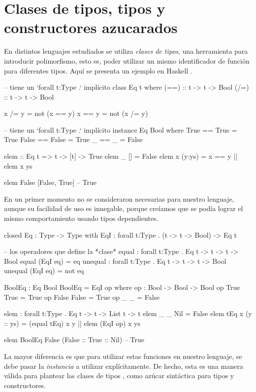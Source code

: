 {\section{Clases de tipos, tipos y constructores azucarados}

\begin{designfr}
En distintos lenguajes estudiados se utiliza \emph{clases de tipos}, una herramienta para introducir polimorfismo, esto es, poder utilizar un mismo identificador de función para diferentes tipos. Aquí se presenta un ejemplo en Haskell \cite{haskell}.

\begin{haskellcode}
-- tiene un `forall t:Type .` implícito
class Eq t where
    (==) :: t -> t -> Bool
    (/=) :: t -> t -> Bool

    x /= y = not (x == y)
    x == y = not (x /= y)

-- tiene un `forall t:Type .` implícito
instance Eq Bool where
    True == True = True
    False == False = True
    _ == _ = False

elem :: Eq t => t -> [t] -> True
elem _ [] = False
elem x (y:ys) = x == y || elem x ys

elem False [False, True]    -- True
\end{haskellcode}

En un primer momento no se consideraron necesarias para nuestro lenguaje, aunque su facilidad de uso es innegable, porque creíamos que se podía lograr el mismo comportamiento usando tipos dependientes.

\begin{anglercode}
closed Eq : Type -> Type with
    EqI : forall t:Type . (t -> t -> Bool) -> Eq t

-- los operadores que define la *clase*
equal : forall t:Type . Eq t -> t -> t -> Bool
equal (EqI eq) = eq
unequal : forall t:Type . Eq t -> t -> t -> Bool
unequal (EqI eq) = not eq

BoolEq : Eq Bool
BoolEq = EqI op
    where
        op : Bool -> Bool -> Bool
        op True  True  = True
        op False False = True
        op _     _     = False

elem : forall t:Type . Eq t -> t -> List t -> t
elem _         _ Nil = False
elem tEq x (y :: ys) = (equal tEq) x y || elem (EqI op) x ys

elem BoolEq False (False :: True :: Nil)    -- True
\end{anglercode}

La mayor diferencia es que para utilizar estas funciones en nuestro lenguaje, se debe pasar la \emph{instancia} a utilizar explícitamente. De hecho, esta es una manera válida para plantear las clases de tipos \cite{scrap-type-classes}, como azúcar sintáctica para tipos y constructores.
\end{designfr}

}
